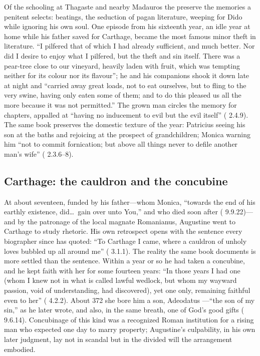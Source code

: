 Of the schooling at Thagaste and nearby Madauros the 
preserve the memories a penitent selects: beatings, the seduction of pagan
literature, weeping for Dido while ignoring his own soul. One episode from
his sixteenth year, an idle year at home while his father saved for
Carthage, became the most famous minor theft in literature. ``I pilfered
that of which I had already sufficient, and much better. Nor did I desire to
enjoy what I pilfered, but the theft and sin itself. There was a pear-tree
close to our vineyard, heavily laden with fruit, which was tempting neither
for its colour nor its flavour''; he and his companions shook it down late
at night and ``carried away great loads, not to eat ourselves, but to fling
to the very swine, having only eaten some of them; and to do this pleased us
all the more because it was not permitted.'' The grown man circles the
memory for chapters, appalled at ``having no inducement to evil but the evil
itself'' ( 2.4.9). The same
book preserves the domestic texture of the year: Patricius seeing his son at
the baths and rejoicing at the prospect of grandchildren; Monica warning him
``not to commit fornication; but above all things never to defile another
man's wife'' ( 2.3.6--8).


\subsection{Carthage: the cauldron and the concubine}

At about seventeen, funded by his father---whom Monica, ``towards the end
of his earthly existence, did\ldots\ gain over unto You,'' and who died soon
after ( 9.9.22)---and by the patronage of the local
magnate Romanianus, Augustine went to Carthage to study rhetoric. His own retrospect opens with the
sentence every biographer since has quoted: ``To Carthage I came, where a
cauldron of unholy loves bubbled up all around me'' (
3.1.1). The reality the same book documents is more settled than the
sentence. Within a year or so he had taken a concubine, and he kept faith
with her for some fourteen years: ``In those years I had one (whom I knew
not in what is called lawful wedlock, but whom my wayward passion, void of
understanding, had discovered), yet one only, remaining faithful even to
her'' ( 4.2.2). About 372 she bore him a son, Adeodatus
---``the son of my sin,'' as he later wrote, and also, in the same breath,
one of God's good gifts ( 9.6.14). Concubinage of this
kind was a recognized Roman institution for a rising man who expected one
day to marry property; Augustine's culpability, in his own later judgment,
lay not in scandal but in the divided will the arrangement embodied.

